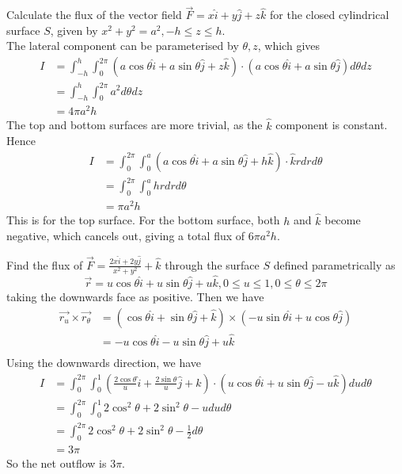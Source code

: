 \documentclass[12pt]{article}
\begin{document}
\begin{ex}
	Calculate the flux of the vector field $\vec{F} = x\hat{i} + y\hat{j} + z\hat{k}$ for the closed cylindrical surface $S$, given by $x^2+y^2=a^2, -h\leq z\leq h$. \\
	The lateral component can be parameterised by $\theta, z$, which gives
	\begin{align*}
		I &= \int_{-h}^h \int_0^{2\pi} (a\cos\theta\hat{i} + a\sin\theta\hat{j} + z\hat{k})\cdot(a\cos\theta\hat{i} + a\sin\theta\hat{j})d\theta dz \\
		  &= \int_{-h}^h \int_0^{2\pi} a^2d\theta dz \\
		  &= 4\pi a^2h
	\end{align*}
	The top and bottom surfaces are more trivial, as the $\hat{k}$ component is constant. Hence
	\begin{align*}
		I &= \int_0^{2\pi}\int_0^a (a\cos\theta\hat{i} + a\sin\theta\hat{j} + h\hat{k}) \cdot \hat{k} rdrd\theta \\
		  &= \int_0^{2\pi}\int_0^a hrdrd\theta \\
		  &= \pi a^2h
	\end{align*}
	This is for the top surface. For the bottom surface, both $h$ and $\hat{k}$ become negative, which cancels out, giving a total flux of $6\pi a^2h$.
\end{ex}

\begin{ex}
	Find the flux of $\vec{F} = \frac{2x\hat{i}+2y\hat{j}}{x^2+y^2} + \hat{k}$ through the surface $S$ defined parametrically as
	$$\vec{r} = u\cos\theta\hat{i} + u\sin\theta\hat{j} + u\hat{k}, 0\leq u\leq1, 0\leq \theta\leq2\pi$$
	taking the downwards face as positive. Then we have
	\begin{align*}
		\vec{r_u} \times \vec{r_\theta} &= (\cos\theta\hat{i} + \sin\theta\hat{j} + \hat{k}) \times (-u\sin\theta\hat{i} + u\cos\theta\hat{j}) \\
						&= -u\cos\theta\hat{i} -u\sin\theta\hat{j} + u\hat{k} \\
	\end{align*}
	Using the downwards direction, we have
	\begin{align*}
		I &= \int_0^{2\pi}\int_0^1 \left(\frac{2\cos\theta}{u}\hat{i} + \frac{2\sin\theta}{u}\hat{j} + \hat{k}\right) \cdot (u\cos\theta\hat{i} + u\sin\theta\hat{j} -u\hat{k}) dud\theta \\
		  &= \int_0^{2\pi}\int_0^1 2\cos^2\theta + 2\sin^2\theta - u dud\theta \\
		  &= \int_0^{2\pi} 2\cos^2\theta + 2\sin^2\theta - \frac{1}{2} d\theta \\
		  &= 3\pi
	\end{align*}
	So the net outflow is $3\pi$.
\end{ex}
\end{document}
